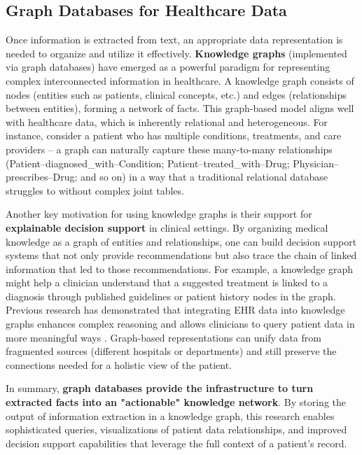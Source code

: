 \subsection{Graph Databases for Healthcare Data}

Once information is extracted from text, an appropriate data representation is needed to organize and utilize it effectively. \textbf{Knowledge graphs} (implemented via graph databases) have emerged as a powerful paradigm for representing complex interconnected information in healthcare. A knowledge graph consists of nodes (entities such as patients, clinical concepts, etc.) and edges (relationships between entities), forming a network of facts. This graph-based model aligns well with healthcare data, which is inherently relational and heterogeneous. For instance, consider a patient who has multiple conditions, treatments, and care providers – a graph can naturally capture these many-to-many relationships (Patient–diagnosed\_with–Condition; Patient–treated\_with–Drug; Physician–prescribes–Drug; and so on) in a way that a traditional relational database struggles to without complex joint tables.

Another key motivation for using knowledge graphs is their support for \textbf{explainable decision support} in clinical settings. By organizing medical knowledge as a graph of entities and relationships, one can build decision support systems that not only provide recommendations but also trace the chain of linked information that led to those recommendations. For example, a knowledge graph might help a clinician understand that a suggested treatment is linked to a diagnosis through published guidelines or patient history nodes in the graph. Previous research has demonstrated that integrating EHR data into knowledge graphs enhances complex reasoning and allows clinicians to query patient data in more meaningful ways \parencite{Rotmensch2017}. Graph-based representations can unify data from fragmented sources (different hospitals or departments) and still preserve the connections needed for a holistic view of the patient.

In summary, \textbf{graph databases provide the infrastructure to turn extracted facts into an "actionable" knowledge network}. By storing the output of information extraction in a knowledge graph, this research enables sophisticated queries, visualizations of patient data relationships, and improved decision support capabilities that leverage the full context of a patient's record.

